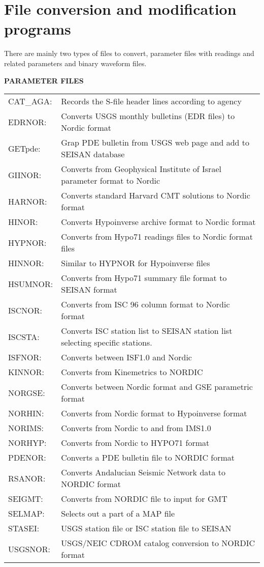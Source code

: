 %
\section{File conversion and modification programs}
\label{sect:file-conversion}

 There are mainly two types of files to convert, parameter files with readings and related parameters and binary waveform files. 

\textbf{PARAMETER FILES}

\begin{tabular}{lp{10cm}}
CAT\_AGA: & Records the S-file header lines according to agency \\
EDRNOR: & Converts USGS monthly bulletins (EDR files) to Nordic format \\
GETpde: & Grap \index{GETPDE}PDE bulletin from USGS web page and add to SEISAN database\\
GIINOR: & Converts from Geophysical Institute of Israel\index{Israel} parameter format to Nordic \\
HARNOR: & Converts standard Harvard CMT solutions to Nordic format \\
HINOR: & Converts Hypoinverse archive format to Nordic format \\
HYPNOR: & Converts from Hypo71 readings files to Nordic format files \\
HINNOR: & Similar to HYPNOR for Hypoinverse files \\
HSUMNOR: & Converts from Hypo71 summary file format to SEISAN format \\
ISCNOR: & Converts from ISC 96 column format to Nordic format \\
ISCSTA: & Converts ISC station list to SEISAN station list selecting specific stations. \\
ISFNOR: & Converts between ISF1.0 and Nordic \\
KINNOR: & Converts from Kinemetrics to NORDIC \\
NORGSE: & Converts between Nordic format and GSE parametric format \\
NORHIN: & Converts from Nordic format to Hypoinverse format \\
NORIMS: & Converts from  Nordic to and from IMS1.0 \\
NORHYP: & Converts from Nordic to HYPO71 format \\
PDENOR: & Converts a \index{PDE bulletin file}PDE bulletin file to NORDIC format \\
RSANOR: & Converts Andalucian Seismic Network data to NORDIC format\index{Andalucia} \\
SEIGMT: & Converts from NORDIC file to input for GMT \\
SELMAP: & Selects out a part of a MAP file \\
STASEI: & USGS station file or ISC station file to SEISAN \\
USGSNOR: & USGS/NEIC CDROM catalog conversion to NORDIC format\\
\end{tabular}
 

